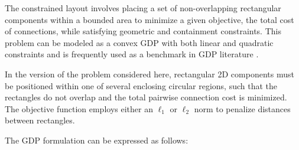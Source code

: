 \documentclass[11pt]{article}
\begin{document}
The constrained layout involves placing a set of non-overlapping rectangular components within a bounded area to minimize a given objective, the total cost of connections, while satisfying geometric and containment constraints.
This problem can be modeled as a convex GDP with both linear and quadratic constraints and is frequently used as a benchmark in GDP literature \cite{ruizHierarchyRelaxationsNonlinear2012,furmanComputationallyUsefulAlgebraic2020, bernalneiraConvexMixedintegerNonlinear2024}.

In the version of the problem considered here, rectangular 2D components must be positioned within one of several enclosing circular regions, such that the rectangles do not overlap and the total pairwise connection cost is minimized.
The objective function employs either an \(\ell_1\) or \(\ell_2\) norm to penalize distances between rectangles.

The GDP formulation can be expressed as follows:
\end{document}
